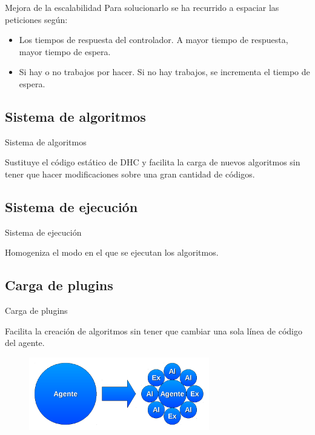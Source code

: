 \documentclass[12pt]{beamer}
\begin{document}
\begin{frame}{Mejora de la escalabilidad}
	Para solucionarlo se ha recurrido a espaciar las peticiones según:
	\pause
	\begin{itemize}
		\item Los tiempos de respuesta del controlador. A mayor tiempo de respuesta, mayor tiempo de espera.
		\item Si hay o no trabajos por hacer. Si no hay trabajos, se incrementa el tiempo de espera.
	\end{itemize}
\end{frame}



\subsection{Sistema de algoritmos}
\begin{frame}{Sistema de algoritmos}
	\begin{center}
		Sustituye el código estático de DHC y facilita la carga de nuevos algoritmos sin tener que hacer modificaciones sobre una gran cantidad de códigos.
	\end{center}
\end{frame}

\subsection{Sistema de ejecución}
\begin{frame}{Sistema de ejecución}
	\begin{center}
		Homogeniza el modo en el que se ejecutan los algoritmos.
	\end{center}
\end{frame}

\subsection{Carga de plugins}
\begin{frame}{Carga de plugins}
	\begin{center}
		Facilita la creación de algoritmos sin tener que cambiar una sola línea de código del agente.
		\begin{figure}
			\centering
			\includegraphics[width=0.7\textwidth]{images/nuevo_agente.pdf}
		\end{figure}

	\end{center}
\end{frame}
\end{document}
